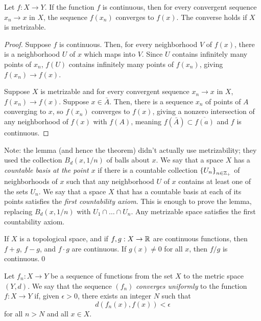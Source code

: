 \documentclass[10pt]{report}
\begin{document}
\begin{theorem}
  Let $f:X \rightarrow Y$.
  If the function $f$ is continuous, then for every convergent sequence $x_n \rightarrow x$ in $X$, the sequence $f(x_n)$ converges to $f(x)$.
  The converse holds if $X$ is metrizable.
\end{theorem}
\begin{proof}
  Suppose $f$ is continuous.
  Then, for every neighborhood $V$ of $f(x)$, there is a neighborhood $U$ of $x$ which maps into $V$.
  Since $U$ contains infinitely many points of $x_n$, $f(U)$ contains infinitely many points of $f(x_n)$, giving $f(x_n) \rightarrow f(x)$.

  Suppose $X$ is metrizable and for every convergent sequence $x_n \rightarrow x$ in $X$, $f(x_n) \rightarrow f(x)$.
  Suppose $x \in \bar A$.
  Then, there is a sequence $x_n$ of points of $A$ converging to $x$, so $f(x_n)$ converges to $f(x)$, giving a nonzero intersection of any neighborhood of $f(x)$ with $f(A)$, meaning $f(\bar A) \subset \overline{f(a)}$ and $f$ is continuous.
\end{proof}

Note: the lemma (and hence the theorem) didn't actually use metrizability; they used the collection $B_d(x,1/n)$ of balls about $x$.
We say that a space $X$ has a \emph{countable basis at the point $x$} if there is a countable collection $\left\{ U_n \right\}_{n \in \mathbb{Z}_+}$ of neighborhoods of $x$ such that any neighborhood $U$ of $x$ contains at least one of the sets $U_n$.
We say that a space $X$ that has a countable basis at each of its points satisfies the \emph{first countability axiom}.
This is enough to prove the lemma, replacing $B_d(x,1/n)$ with $U_1 \cap \dots \cap U_n$.
Any metrizable space satisfies the first countability axiom.

\begin{theorem}
  If $X$ is a topological space, and if $f,g:X \rightarrow \mathbb{R}$ are continuous functions, then $f+g$, $f - g$, and $f \cdot g$ are continuous.
  If $g(x) \neq 0$ for all $x$, then $f/g$ is continuous.\qed
\end{theorem}

\begin{definition}
  Let $f_n:X \rightarrow Y$ be a sequence of functions from the set $X$ to the metric space $(Y,d)$.
  We say that the sequence $(f_n)$ \emph{converges uniformly} to the function $f:X \rightarrow Y$ if, given $\epsilon > 0$, there exists an integer $N$ such that
  \[  d(f_n(x),f(x)) < \epsilon \]
  for all $n > N$ and all $x \in X$.
\end{definition}
\end{document}
